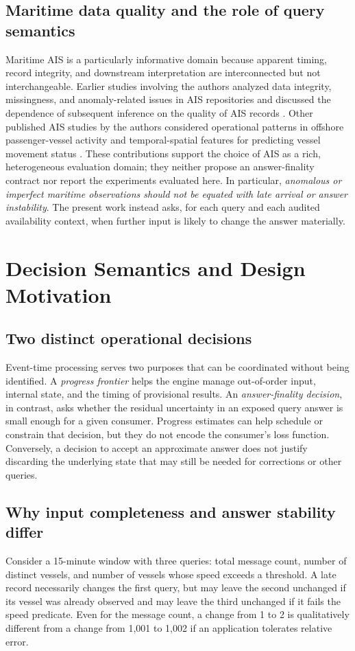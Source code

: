 \documentclass[conference]{IEEEtran}
\begin{document}
\subsection{Maritime data quality and the role of query semantics}
Maritime AIS is a particularly informative domain because apparent timing, record integrity, and downstream interpretation are interconnected but not interchangeable. Earlier studies involving the authors analyzed data integrity, missingness, and anomaly-related issues in AIS repositories \cite{kiersztyn2024aisintegrity} and discussed the dependence of subsequent inference on the quality of AIS records \cite{kiersztyn2025aisaccuracy}. Other published AIS studies by the authors considered operational patterns in offshore passenger-vessel activity \cite{czerwinski2023offshore} and temporal-spatial features for predicting vessel movement status \cite{kiersztyn2025vesselstatus}. These contributions support the choice of AIS as a rich, heterogeneous evaluation domain; they neither propose an answer-finality contract nor report the experiments evaluated here. In particular, \emph{anomalous or imperfect maritime observations should not be equated with late arrival or answer instability}. The present work instead asks, for each query and each audited availability context, when further input is likely to change the answer materially.

\section{Decision Semantics and Design Motivation}
\subsection{Two distinct operational decisions}
Event-time processing serves two purposes that can be coordinated without being identified. A \emph{progress frontier} helps the engine manage out-of-order input, internal state, and the timing of provisional results. An \emph{answer-finality decision}, in contrast, asks whether the residual uncertainty in an exposed query answer is small enough for a given consumer. Progress estimates can help schedule or constrain that decision, but they do not encode the consumer's loss function. Conversely, a decision to accept an approximate answer does not justify discarding the underlying state that may still be needed for corrections or other queries.

\subsection{Why input completeness and answer stability differ}
Consider a 15-minute window with three queries: total message count, number of distinct vessels, and number of vessels whose speed exceeds a threshold. A late record necessarily changes the first query, but may leave the second unchanged if its vessel was already observed and may leave the third unchanged if it fails the speed predicate. Even for the message count, a change from 1 to 2 is qualitatively different from a change from 1,001 to 1,002 if an application tolerates relative error.
\end{document}
